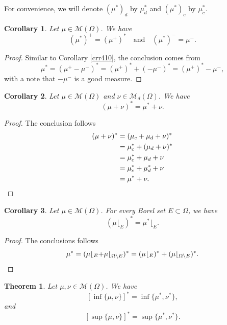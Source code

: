 \documentclass[a4paper, 11pt]{report}
\newtheorem{thm}{Theorem}[chapter]
\newtheorem{crr}{Corollary}[chapter]
\theoremstyle{definition}\newtheorem*{rmk}{Remark}
\begin{document}
For convenience, we will denote $(\mu^*)_d$ by $\mu^*_d$ and $(\mu^*)_c$ by $\mu^*_c$.

\begin{crr}
Let $\mu \in \mathcal{M}(\Omega)$. We have
\[
(\mu^*)^+ = (\mu^+)^* \quad \text{and} \quad (\mu^*)^- = \mu^-.
\]
\end{crr}

\begin{proof}
Similar to Corollary \ref{crr410}, the conclusion comes from
\[
\mu^* = (\mu^+ - \mu^-)^* = (\mu^+)^* + (-\mu^-)^* = (\mu^+)^* - \mu^-,
\]
with a note that $-\mu^-$ is a good measure.
\end{proof}

\begin{crr}
Let $\mu \in \mathcal{M}(\Omega)$ and $\nu \in \mathcal{M}_d(\Omega)$. We have
\[
(\mu + \nu)^* = \mu^* + \nu.
\]
\end{crr}

\begin{proof}
The conclusion follows
\begin{align*}
(\mu + \nu)^* &= (\mu_c + \mu_d + \nu)^*\\
&= \mu_c^* + (\mu_d + \nu)^*\\
&= \mu_c^* + \mu_d + \nu \\
&= \mu_c^* + \mu_d^* + \nu \\
&= \mu^* + \nu.\qedhere
\end{align*}
\end{proof}

\begin{crr}\label{crr11}
Let $\mu \in \mathcal{M}(\Omega)$. For every Borel set $E \subset \Omega$, we have
\[
(\mu\lfloor_E)^* = \mu^*\lfloor_E.
\]
\end{crr}

\begin{proof}
The conclusions follows
\[
\mu^* = (\mu\lfloor_E + \mu\lfloor_{\Omega\setminus E})^* = (\mu\lfloor_E)^* + (\mu\lfloor_{\Omega\setminus E})^*. \qedhere
\]
\end{proof}

\begin{thm}
Let $\mu, \nu\in\mathcal{M}(\Omega)$. We have
\begin{equation}\label{infid}
[\inf\{\mu,\nu \}]^* = \inf\{\mu^*,\nu^*\},
\end{equation}
and
\begin{equation}\label{supid}
[\sup\{\mu,\nu\}]^* = \sup\{\mu^*,\nu^*\}.
\end{equation}
\end{thm}
\end{document}
